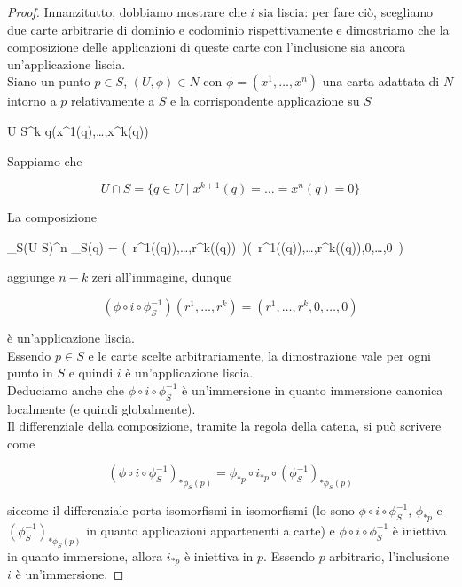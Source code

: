 \begin{proof}
	Innanzitutto, dobbiamo mostrare che $ i $ sia liscia: per fare ciò, scegliamo due carte arbitrarie di dominio e codominio rispettivamente e dimostriamo che la composizione delle applicazioni di queste carte con l'inclusione sia ancora un'applicazione liscia.\\
	Siano un punto $ p \in S $, $ (U,\phi) \in N $ con $ \phi = (x^{1},\dots,x^{n}) $ una carta adattata di $ N $ intorno a $ p $ relativamente a $ S $ e la corrispondente applicazione su $ S $
	
		{U \cap S}{\R^{k}}
		{q}{(x^{1}(q),\dots,x^{k}(q))}
	
	Sappiamo che
	
	\begin{equation}
		U \cap S = \{ q \in U \mid x^{k+1}(q) = \dots = x^{n}(q) = 0 \}
	\end{equation}

	La composizione
	
		{\phi_{S}(U \cap S)}{\R^{n}}
		{\phi_{S}(q) = (\, r^{1}(\phi(q)),\dots,r^{k}(\phi(q)) \,)}{(\, r^{1}(\phi(q)),\dots,r^{k}(\phi(q)),0,\dots,0 \,)}
	
	aggiunge $ n-k $ zeri all'immagine, dunque
	
	\begin{equation}
		(\phi \circ i \circ \phi_{S}^{-1}) (r^{1},\dots,r^{k}) = (r^{1},\dots,r^{k},0,\dots,0)
	\end{equation}

	è un'applicazione liscia.\\	
	Essendo $ p \in S $ e le carte scelte arbitrariamente, la dimostrazione vale per ogni punto in $ S $ e quindi $ i $ è un'applicazione liscia.\\
	Deduciamo anche che $ \phi \circ i \circ \phi_{S}^{-1} $ è un'immersione in quanto immersione canonica localmente (e quindi globalmente).\\
	Il differenziale della composizione, tramite la regola della catena, si può scrivere come
	
	\begin{equation}
		(\phi \circ i \circ \phi_{S}^{-1})_{*\phi_{S}(p)} = \phi_{*p} \circ i_{*p} \circ (\phi_{S}^{-1})_{*\phi_{S}(p)}
	\end{equation}

	siccome il differenziale porta isomorfismi in isomorfismi (lo sono $ \phi \circ i \circ \phi_{S}^{-1} $, $ \phi_{*p} $ e $ (\phi_{S}^{-1})_{*\phi_{S}(p)} $ in quanto applicazioni appartenenti a carte) e $ \phi \circ i \circ \phi_{S}^{-1} $ è iniettiva in quanto immersione, allora $ i_{*p} $ è iniettiva in $ p $. Essendo $ p $ arbitrario, l'inclusione $ i $ è un'immersione.
\end{proof}

